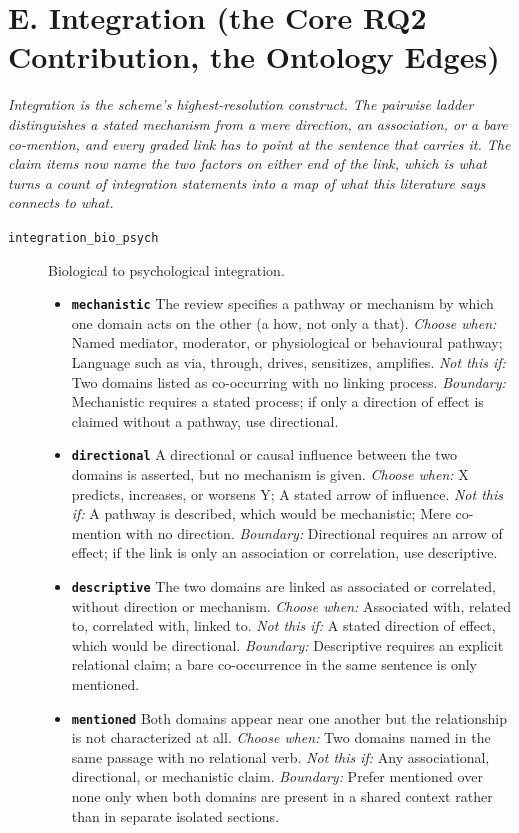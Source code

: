 \documentclass[11pt]{article}
\begin{document}
\section*{E. Integration (the Core RQ2 Contribution, the Ontology Edges)}
{\small\itshape Integration is the scheme's highest-resolution construct. The pairwise ladder distinguishes a stated mechanism from a mere direction, an association, or a bare co-mention, and every graded link has to point at the sentence that carries it. The claim items now name the two factors on either end of the link, which is what turns a count of integration statements into a map of what this literature says connects to what.}\par\smallskip
\begin{description}
\item[\texttt{integration\_bio\_psych}] Biological to psychological integration.
  \begin{itemize}[leftmargin=1.3em,itemsep=2pt,topsep=2pt]
  \item \textbf{\texttt{mechanistic}} The review specifies a pathway or mechanism by which one domain acts on the other (a how, not only a that). {\small \textit{Choose when:} Named mediator, moderator, or physiological or behavioural pathway; Language such as via, through, drives, sensitizes, amplifies. \textit{Not this if:} Two domains listed as co-occurring with no linking process. \textit{Boundary:} Mechanistic requires a stated process; if only a direction of effect is claimed without a pathway, use directional.}
  \item \textbf{\texttt{directional}} A directional or causal influence between the two domains is asserted, but no mechanism is given. {\small \textit{Choose when:} X predicts, increases, or worsens Y; A stated arrow of influence. \textit{Not this if:} A pathway is described, which would be mechanistic; Mere co-mention with no direction. \textit{Boundary:} Directional requires an arrow of effect; if the link is only an association or correlation, use descriptive.}
  \item \textbf{\texttt{descriptive}} The two domains are linked as associated or correlated, without direction or mechanism. {\small \textit{Choose when:} Associated with, related to, correlated with, linked to. \textit{Not this if:} A stated direction of effect, which would be directional. \textit{Boundary:} Descriptive requires an explicit relational claim; a bare co-occurrence in the same sentence is only mentioned.}
  \item \textbf{\texttt{mentioned}} Both domains appear near one another but the relationship is not characterized at all. {\small \textit{Choose when:} Two domains named in the same passage with no relational verb. \textit{Not this if:} Any associational, directional, or mechanistic claim. \textit{Boundary:} Prefer mentioned over none only when both domains are present in a shared context rather than in separate isolated sections.}

\end{itemize}
\end{description}
\end{document}
